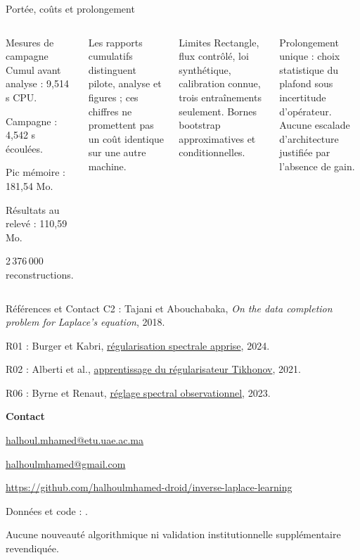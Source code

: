 \documentclass[aspectratio=169,10pt]{beamer}
\begin{document}
\begin{frame}{Portée, coûts et prolongement}
\begin{columns}[T]
\begin{block}{Mesures de campagne}
\small Cumul avant analyse : 9,514 s CPU.\par
Campagne : 4,542 s écoulées.\par
Pic mémoire : 181,54 Mo.\par
Résultats au relevé : 110,59 Mo.\par
2\,376\,000 reconstructions.
\end{block}
\small Les rapports cumulatifs distinguent pilote, analyse et figures ; ces chiffres ne promettent pas un coût identique sur une autre machine.
\begin{block}{Limites}
\small Rectangle, flux contrôlé, loi synthétique, calibration connue, trois entraînements seulement. Bornes bootstrap approximatives et conditionnelles.
\end{block}
\small Prolongement unique : choix statistique du plafond sous incertitude d'opérateur. Aucune escalade d'architecture justifiée par l'absence de gain.
\end{columns}
\end{frame}

\begin{frame}{Références et Contact}
\scriptsize
C2 : Tajani et Abouchabaka, \emph{On the data completion problem for Laplace's equation}, 2018.\par
R01 : Burger et Kabri, \href{https://arxiv.org/abs/2312.09845v2}{régularisation spectrale apprise}, 2024.\par
R02 : Alberti et al., \href{https://arxiv.org/abs/2106.06513}{apprentissage du régularisateur Tikhonov}, 2021.\par
R06 : Byrne et Renaut, \href{https://doi.org/10.3934/ipi.2023006}{réglage spectral observationnel}, 2023.\par
\vspace{4mm}
\normalsize\textbf{Contact}\par
\small\href{mailto:halhoul.mhamed@etu.uae.ac.ma}{halhoul.mhamed@etu.uae.ac.ma}\par
\href{mailto:halhoulmhamed@gmail.com}{halhoulmhamed@gmail.com}\par
\scriptsize\url{https://github.com/halhoulmhamed-droid/inverse-laplace-learning}\par
\vspace{4mm}
\tiny Données et code : \texttt{\DataCommit}.\par
Aucune nouveauté algorithmique ni validation institutionnelle supplémentaire revendiquée.
\end{frame}
\end{document}
